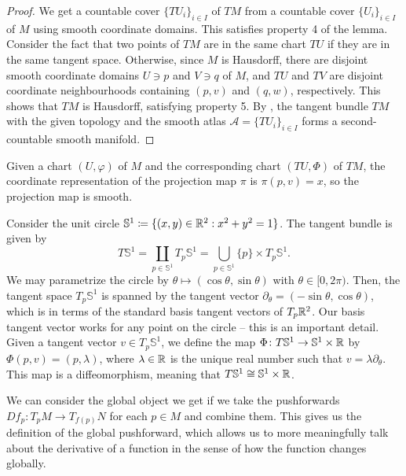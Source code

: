 \documentclass[a4paper,12pt]{article}
\begin{document}
\begin{proof}
    We get a countable cover $\{TU_i\}_{i \in I}$ of $TM$ from a countable cover $\{U_i\}_{i \in I}$ of $M$ using smooth coordinate domains.
    This satisfies property 4 of the lemma.
    Consider the fact that two points of $TM$ are in the same chart $TU$ if they are in the same tangent space.
    Otherwise, since $M$ is Hausdorff, there are disjoint smooth coordinate domains $U \ni p$ and $V \ni q$ of $M$, and $TU$ and $TV$ are disjoint coordinate neighbourhoods containing $(p, v)$ and $(q, w)$, respectively.
    This shows that $TM$ is Hausdorff, satisfying property 5.
    By , the tangent bundle $TM$ with the given topology and the smooth atlas $\mathcal{A} = \{TU_i\}_{i \in I}$ forms a second-countable smooth manifold.
\end{proof}
\begin{remark}
    Given a chart $(U, \varphi)$ of $M$ and the corresponding chart $(TU, \Phi)$ of $TM$, the coordinate representation of the projection map $\pi$ is $\pi(p, v) = x$, so the projection map is smooth.
\end{remark}
\begin{example}
    Consider the unit circle $\mathbb{S}^1 \coloneq \{(x, y) \in \mathbb{R}^2 : x^2 + y^2 = 1\}$.
    The tangent bundle is given by
    \begin{equation}
        T\mathbb{S}^1 = \coprod_{p \in \mathbb{S}^1} T_p \mathbb{S}^1 = \bigcup_{p \in \mathbb{S}^1} \{p\} \times T_p \mathbb{S}^1.
    \end{equation}
    We may parametrize the circle by $\theta \mapsto (\cos\theta, \sin\theta)$ with $\theta \in [0, 2\pi)$.
    Then, the tangent space $T_p \mathbb{S}^1$ is spanned by the tangent vector $\partial_\theta = (-\sin\theta, \cos\theta)$, which is in terms of the standard basis tangent vectors of $T_p \mathbb{R}^2$.
    Our basis tangent vector works for any point on the circle -- this is an important detail.
    Given a tangent vector $v \in T_p \mathbb{S}^1$, we define the map $\Phi \colon T\mathbb{S}^1 \to \mathbb{S}^1 \times \mathbb{R}$ by $\Phi(p, v) = (p, \lambda)$, where $\lambda \in \mathbb{R}$ is the unique real number such that $v = \lambda\partial_\theta$.
    This map is a diffeomorphism, meaning that $T\mathbb{S}^1 \cong \mathbb{S}^1 \times \mathbb{R}$.
\end{example}
We can consider the global object we get if we take the pushforwards $Df_p \colon T_p M \to T_{f(p)} N$ for each $p \in M$ and combine them.
This gives us the definition of the global pushforward, which allows us to more meaningfully talk about the derivative of a function in the sense of how the function changes globally.
\end{document}
